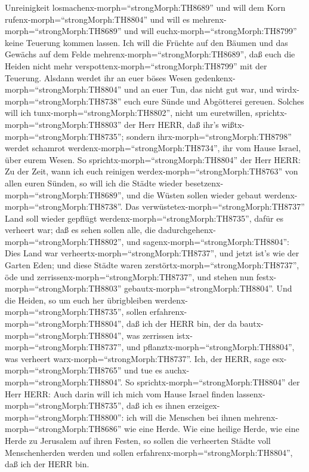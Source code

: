 Unreinigkeit losmachenx-morph=``strongMorph:TH8689'' und will dem Korn
rufenx-morph=``strongMorph:TH8804'' und will es
mehrenx-morph=``strongMorph:TH8689'' und will
euchx-morph=``strongMorph:TH8799'' keine Teuerung kommen lassen.
 Ich will die Früchte auf den Bäumen und das Gewächs auf
dem Felde mehrenx-morph=``strongMorph:TH8689'', daß euch die Heiden
nicht mehr verspottenx-morph=``strongMorph:TH8799'' mit der Teuerung.
 Alsdann werdet ihr an euer böses Wesen
gedenkenx-morph=``strongMorph:TH8804'' und an euer Tun, das nicht gut
war, und wirdx-morph=``strongMorph:TH8738'' euch eure Sünde und
Abgötterei gereuen.  Solches will ich
tunx-morph=``strongMorph:TH8802'', nicht um euretwillen,
sprichtx-morph=``strongMorph:TH8803'' der Herr HERR, daß ihr's
wißtx-morph=``strongMorph:TH8735''; sondern
ihrx-morph=``strongMorph:TH8798'' werdet schamrot
werdenx-morph=``strongMorph:TH8734'', ihr vom Hause Israel, über eurem
Wesen.  So sprichtx-morph=``strongMorph:TH8804'' der Herr
HERR: Zu der Zeit, wann ich euch reinigen
werdex-morph=``strongMorph:TH8763'' von allen euren Sünden, so will ich
die Städte wieder besetzenx-morph=``strongMorph:TH8689'', und die Wüsten
sollen wieder gebaut werdenx-morph=``strongMorph:TH8738''. 
Das verwüstetex-morph=``strongMorph:TH8737'' Land soll wieder gepflügt
werdenx-morph=``strongMorph:TH8735'', dafür es verheert war; daß es
sehen sollen alle, die dadurchgehenx-morph=``strongMorph:TH8802'',
 und sagenx-morph=``strongMorph:TH8804'': Dies Land war
verheertx-morph=``strongMorph:TH8737'', und jetzt ist's wie der Garten
Eden; und diese Städte waren zerstörtx-morph=``strongMorph:TH8737'', öde
und zerrissenx-morph=``strongMorph:TH8737'', und stehen nun
festx-morph=``strongMorph:TH8803'' gebautx-morph=``strongMorph:TH8804''.
 Und die Heiden, so um euch her übrigbleiben
werdenx-morph=``strongMorph:TH8735'', sollen
erfahrenx-morph=``strongMorph:TH8804'', daß ich der HERR bin, der da
bautx-morph=``strongMorph:TH8804'', was zerrissen
istx-morph=``strongMorph:TH8737'', und
pflanztx-morph=``strongMorph:TH8804'', was verheert
warx-morph=``strongMorph:TH8737''. Ich, der HERR, sage
esx-morph=``strongMorph:TH8765'' und tue es
auchx-morph=``strongMorph:TH8804''.  So
sprichtx-morph=``strongMorph:TH8804'' der Herr HERR: Auch darin will ich
mich vom Hause Israel finden lassenx-morph=``strongMorph:TH8735'', daß
ich es ihnen erzeigex-morph=``strongMorph:TH8800'': ich will die
Menschen bei ihnen mehrenx-morph=``strongMorph:TH8686'' wie eine Herde.
 Wie eine heilige Herde, wie eine Herde zu Jerusalem auf
ihren Festen, so sollen die verheerten Städte voll Menschenherden werden
und sollen erfahrenx-morph=``strongMorph:TH8804'', daß ich der HERR bin.

